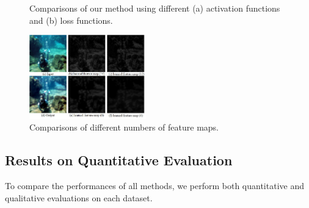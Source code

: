 \documentclass[journal]{IEEEtran}
\begin{document}
\begin{figure}[ht]
\centering  %
\hspace{12mm}
\caption{Comparisons of our method using  different (a) activation functions and (b) loss functions.}
\label{Fig11}
\end{figure}


\begin{figure}[htbp] 
	\centering  %
	\includegraphics[width=0.45\textwidth]{Figs/Fig12.jpg}
	\caption{Comparisons of different numbers of feature maps.}
	\label{Fig12}
\end{figure}






\subsection{Results on Quantitative Evaluation}
To compare the performances of all methods, we perform both quantitative and qualitative evaluations on each dataset.
\end{document}
